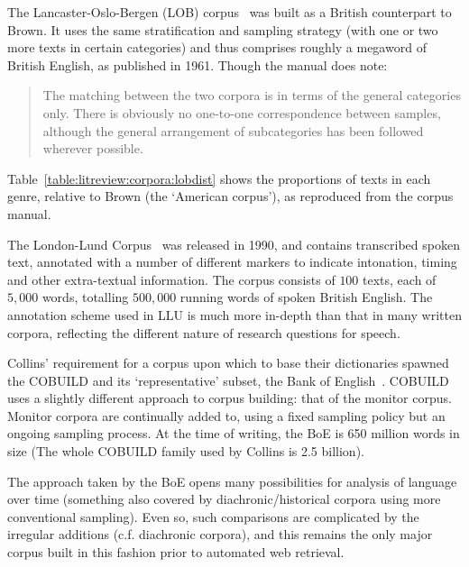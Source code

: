 The Lancaster-Oslo-Bergen (LOB) corpus~\cite{johansson1986tagged} was built as a British counterpart to Brown.  
It uses the same stratification and sampling strategy (with one or two more texts in certain categories) and thus comprises roughly a megaword of British English, as published in 1961.  %
Though the manual does note:

\begin{quote}
    The matching between the two corpora is in terms of the general categories only. There is obviously no one-to-one correspondence between samples, although the general arrangement of subcategories has been followed wherever possible.
\end{quote}

Table~\ref{table:litreview:corpora:lobdist} shows the proportions of texts in each genre, relative to Brown (the `American corpus'), as reproduced from the corpus manual.

The London-Lund Corpus~\cite{greenbaum1990london} was released in 1990, and contains transcribed spoken text, annotated with a number of different markers to indicate intonation, timing and other extra-textual information.  
The corpus consists of $100$ texts, each of $5,000$ words, totalling $500,000$ running words of spoken British English.
The annotation scheme used in LLU is much more in-depth than that in many written corpora, reflecting the different nature of research questions for speech.



Collins' requirement for a corpus upon which to base their dictionaries spawned the COBUILD and its `representative' subset, the Bank of English~\cite{Jarvinen1994AMW991886.991985,sinclair1987looking}.  COBUILD uses a slightly different approach to corpus building: that of the monitor corpus.  Monitor corpora are continually added to, using a fixed sampling policy but an ongoing sampling process.  At the time of writing, the BoE is 650 million words in size (The whole COBUILD family used by Collins is 2.5 billion).

The approach taken by the BoE opens many possibilities for analysis of language over time (something also covered by diachronic/historical corpora using more conventional sampling).  Even so, such comparisons are complicated by the irregular additions (c.f. diachronic corpora), and this remains the only major corpus built in this fashion prior to automated web retrieval.


